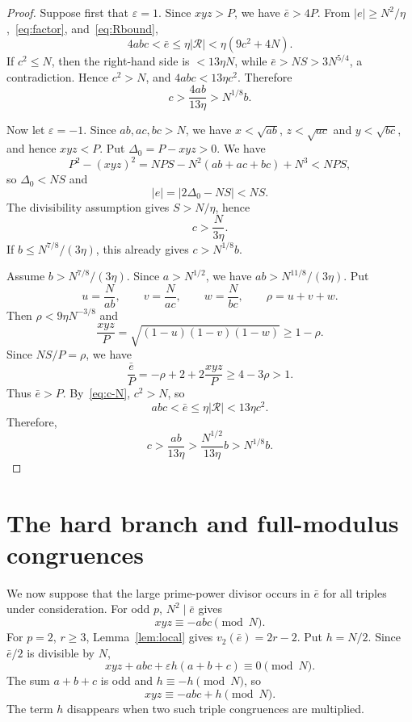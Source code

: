 \documentclass[11pt]{amsart}
\theoremstyle{remark}
\newcommand{\eps}{\varepsilon}
\newcommand{\vtwo}{v_2}
\begin{document}
\begin{proof}
Suppose first that $\eps=1$.  Since $xyz>P$, we have $\bar e>4P$.  From
$|e|\ge N^2/\eta$,~\eqref{eq:factor}, and~\eqref{eq:Rbound},
\[
 4abc<\bar e\le \eta |\mathcal R|<\eta(9c^2+4N).
\]
If $c^2\le N$, then the right-hand side is $<13\eta N$, while
$\bar e>NS>3N^{5/4}$, a contradiction.  Hence $c^2>N$, and
$4abc<13\eta c^2$.  Therefore
\[
 c>\frac{4ab}{13\eta}>N^{1/8}b.
\]

Now let $\eps=-1$. Since $ab,ac,bc>N$, we have
$x<\sqrt{ab}$, $z<\sqrt{ac}$ and $y<\sqrt{bc}$, and hence $xyz<P$.
Put $\Delta_0=P-xyz>0$. We have
\[
 P^2-(xyz)^2=NPS-N^2(ab+ac+bc)+N^3<NPS,
\]
so $\Delta_0<NS$ and
\begin{equation}
 |e|=|2\Delta_0-NS|<NS.
\end{equation}
The divisibility assumption gives $S>N/\eta$, hence
\begin{equation}\label{eq:c-N}
 c>\frac{N}{3\eta}.
\end{equation}
If $b\le N^{7/8}/(3\eta)$, this already gives $c>N^{1/8}b$.

Assume $b>N^{7/8}/(3\eta)$.  Since $a>N^{1/2}$, we have 
$ab>N^{11/8}/(3\eta)$.  Put
\[
 u=\frac{N}{ab},\qquad v=\frac{N}{ac},\qquad w=\frac{N}{bc},
 \qquad \rho=u+v+w.
\]
Then $\rho<9\eta N^{-3/8}$ and
\[
 \frac{xyz}{P}=\sqrt{(1-u)(1-v)(1-w)}\ge1-\rho.
\]
Since $NS/P=\rho$, we have 
\[
 \frac{\bar e}{P}=-\rho+2+2\frac{xyz}{P}\ge4-3\rho>1.
\]
Thus $\bar e>P$.  By~\eqref{eq:c-N}, $c^2>N$, so
\[
 abc<\bar e\le\eta|\mathcal R|<13\eta c^2.
\]
Therefore, 
\[
 c>\frac{ab}{13\eta}>\frac{N^{1/2}}{13\eta}b>N^{1/8}b.
\]
\end{proof}

\section{The hard branch and full-modulus congruences}

We now suppose that the large prime-power divisor occurs in $\bar e$ for all
triples under consideration.  For odd $p$, $N^2\mid\bar e$ gives
\begin{equation}
 xyz\equiv-abc\pmod N.
\end{equation}
For $p=2$, $r\ge3$, Lemma~\ref{lem:local} gives
$\vtwo(\bar e)=2r-2$.  Put $h=N/2$.  Since $\bar e/2$ is divisible by $N$,
\[
 xyz+abc+\eps h(a+b+c)\equiv0\pmod N.
\]
The sum $a+b+c$ is odd and $h\equiv-h\pmod N$, so
\begin{equation}\label{eq:triple-two}
 xyz\equiv-abc+h\pmod N.
\end{equation}
The term $h$ disappears when two such triple congruences are multiplied.
\end{document}
